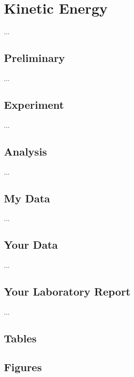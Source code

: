 \setcounter{chapter}{6}
\chapter{Kinetic Energy}
...
\section{Preliminary}
...
\section{Experiment}
...
\section{Analysis}
...
\section{My Data}
...
\section{Your Data}
...
\newpage
\section{Your Laboratory Report}
...
\newpage
\section{Tables}
\FloatBarrier
\newpage
\section{Figures}
